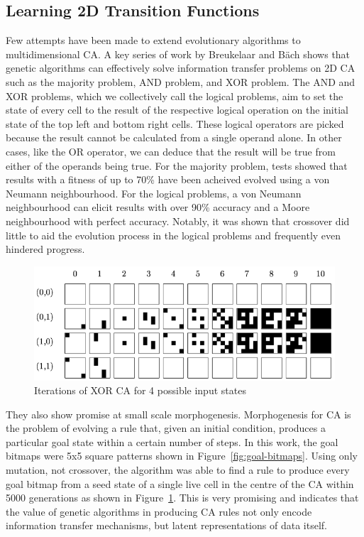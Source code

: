 \subsection{Learning 2D Transition Functions}

Few attempts have been made to extend evolutionary algorithms to multidimensional CA. A key series of work by Breukelaar and B{\"a}ch\cite{breukelaar2004evolving} shows that genetic algorithms can effectively solve information transfer problems on 2D CA such as the majority problem, AND problem, and XOR problem. The AND and XOR problems, which we collectively call the logical problems, aim to set the state of every cell to the result of the respective logical operation on the initial state of the top left and bottom right cells. These logical operators are picked because the result cannot be calculated from a single operand alone. In other cases, like the OR operator, we can deduce that the result will be true from either of the operands being true. For the majority problem, tests showed that results with a fitness of up to 70\% have been acheived evolved using a von Neumann neighbourhood. For the logical problems, a von Neumann neighbourhood can elicit results with over 90\% accuracy and a Moore neighbourhood with perfect accuracy. Notably, it was shown that crossover did little to aid the evolution process in the logical problems and frequently even hindered progress.\\

\begin{figure}[!h]
\centering
\includegraphics[width=.8\textwidth]{images/XOR-ca.png}
\caption{Iterations of XOR CA for 4 possible input states\cite{breukelaar2004evolving}}
\label{fig:xor}
\end{figure}

They also show promise at small scale morphogenesis. Morphogenesis for CA is the problem of evolving a rule that, given an initial condition, produces a particular goal state within a certain number of steps. In this work, the goal bitmaps were 5x5 square patterns shown in Figure~\ref{fig:goal-bitmaps}. Using only mutation, not crossover, the algorithm was able to find a rule to produce every goal bitmap from a seed state of a single live cell in the centre of the CA within 5000 generations as shown in Figure~\ref{fig:xor}. This is very promising and indicates that the value of genetic algorithms in producing CA rules not only encode information transfer mechanisms, but latent representations of data itself.\\

